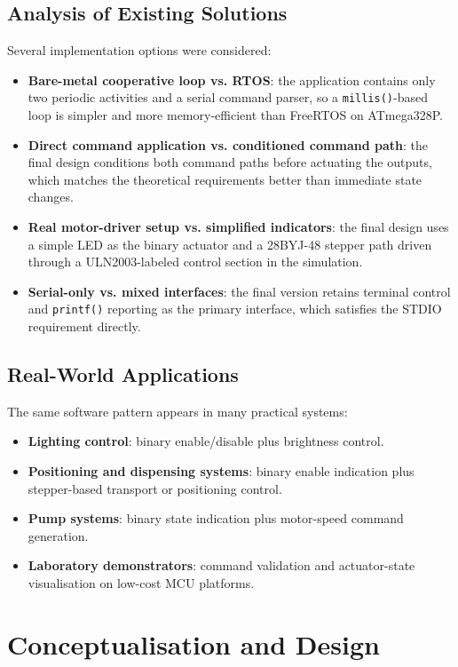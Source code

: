\documentclass[12pt]{article}
\begin{document}
\subsection{Analysis of Existing Solutions}
\hspace{0.8cm} Several implementation options were considered:
\begin{itemize}
    \item \textbf{Bare-metal cooperative loop vs. RTOS}: the application contains only two periodic activities and a serial command parser, so a \texttt{millis()}-based loop is simpler and more memory-efficient than FreeRTOS on ATmega328P.
    \item \textbf{Direct command application vs. conditioned command path}: the final design conditions both command paths before actuating the outputs, which matches the theoretical requirements better than immediate state changes.
    \item \textbf{Real motor-driver setup vs. simplified indicators}: the final design uses a simple LED as the binary actuator and a 28BYJ-48 stepper path driven through a ULN2003-labeled control section in the simulation.
    \item \textbf{Serial-only vs. mixed interfaces}: the final version retains terminal control and \texttt{printf()} reporting as the primary interface, which satisfies the STDIO requirement directly.
\end{itemize}

\subsection{Real-World Applications}
\hspace{0.8cm} The same software pattern appears in many practical systems:
\begin{itemize}
    \item \textbf{Lighting control}: binary enable/disable plus brightness control.
    \item \textbf{Positioning and dispensing systems}: binary enable indication plus stepper-based transport or positioning control.
    \item \textbf{Pump systems}: binary state indication plus motor-speed command generation.
    \item \textbf{Laboratory demonstrators}: command validation and actuator-state visualisation on low-cost MCU platforms.
\end{itemize}

\section{Conceptualisation and Design}
\end{document}
